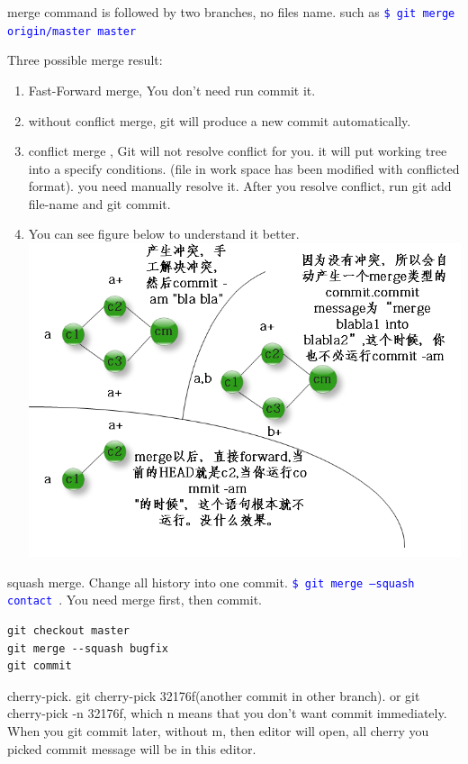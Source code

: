 \documentclass[paper=8.5in:11in, twoside, 12pt, pagesize=pdftex]{book}
\newcommand{\linuxcommand}[1]{\texttt{\textcolor{blue}{\$ #1 \Pisymbol{psy}{191}}}}
\begin{document}
	merge command is followed by two branches, no files name.  such as \linuxcommand{git merge origin/master master}
	
Three possible merge result:
	\begin{enumerate}
		\item Fast-Forward merge, You don't need run commit it. 
		\item without conflict merge,  git will produce a new commit automatically.
		
		\item conflict merge , Git will not resolve conflict for you. it will put working tree into a specify conditions. (file in work space has been modified with conflicted format). you need manually resolve it.
		After you resolve conflict, run git add file-name and git commit.
		
		\item You can see figure below to understand it better. \\
		\includegraphics[scale=0.5]{pics/git-merge} 
	\end{enumerate}
	
squash merge. Change all history into one commit. \linuxcommand{git merge --squash contact}. You need merge first, then commit.
\begin{lstlisting}
git checkout master
git merge --squash bugfix
git commit	
\end{lstlisting}
	
	cherry-pick. git cherry-pick 32176f(another commit in other branch). or git cherry-pick -n 32176f, which n means that you don't want commit immediately. When you git commit later, without m, then editor will open, all cherry you picked commit message will be in this editor. 
	
\end{document}
